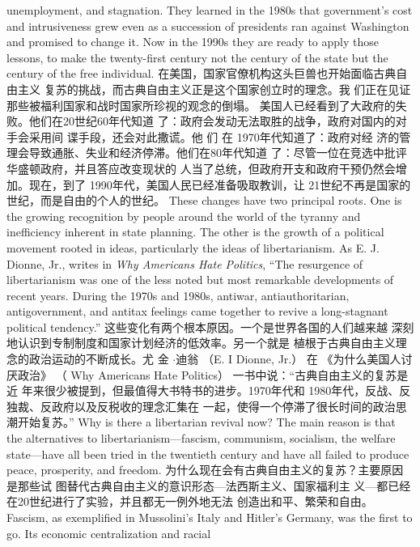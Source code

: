 \begin{paracol}{2}
unemployment, and stagnation. They learned in the 1980s that
government's cost and intrusiveness grew even as a succession
of presidents ran against Washington and promised to change
it. Now in the 1990s they are ready to apply those lessons, to
make the twenty-first century not the century of the state but
the century of the free individual.
\switchcolumn
在美国，国家官僚机构这头巨兽也开始面临古典自由主义
复苏的挑战，而古典自由主义正是这个国家创立时的理念。我
们正在见证那些被福利国家和战时国家所珍视的观念的倒塌。
美国人已经看到了大政府的失败。他们在20世纪60年代知道
了：政府会发动无法取胜的战争，政府对国内的对手会采用间
谍手段，还会对此撒谎。他 们 在 1970年代知道了：政府对经
济的管理会导致通胀、失业和经济停滞。他们在80年代知道
了：尽管一位在竞选中批评华盛顿政府，并且答应改变现状的
人当了总统，但政府开支和政府干预仍然会增加。现在，到了
1990年代，美国人民已经准备吸取教训，让 21世纪不再是国家的世纪，而是自由的个人的世纪。
\switchcolumn*
These changes have two principal roots. One is the growing
recognition by people around the world of the tyranny and inefficiency inherent in state planning. The other is the growth of a
political movement rooted in ideas, particularly the ideas of libertarianism. As E. J. Dionne, Jr., writes in \textit{Why Americans Hate Politics}, ``The resurgence of libertarianism was one of the less
noted but most remarkable developments of recent years. During the 1970s and 1980s, antiwar, antiauthoritarian, antigovernment, and antitax feelings came together to revive a
long-stagnant political tendency.''
\switchcolumn
这些变化有两个根本原因。一个是世界各国的人们越来越
深刻地认识到专制制度和国家计划经济的低效率。另一个就是
植根于古典自由主义理念的政治运动的不断成长。尤 金 $\cdot$迪翁
（E. I Dionne, Jr.） 在 《为什么美国人讨厌政治》 （ Why Americans Hate Politics） 一书中说：“古典自由主义的复苏是近
年来很少被提到，但最值得大书特书的进步。1970年代和
1980年代，反战、反独裁、反政府以及反税收的理念汇集在
一起，使得一个停滞了很长时间的政治思潮开始复苏。”
\switchcolumn*
Why is there a libertarian revival now? The main reason is
that the alternatives to libertarianism---fascism, communism,
socialism, the welfare state---have all been tried in the twentieth century and have all failed to produce peace, prosperity, and freedom.
\switchcolumn
为什么现在会有古典自由主义的复苏？主要原因是那些试
图替代古典自由主义的意识形态---法西斯主义、国家福利主
义---都已经在20世纪进行了实验，并且都无一例外地无法
创造出和平、繁荣和自由。
\switchcolumn*
Fascism, as exemplified in Mussolini's Italy and Hitler's Germany, was the first to go. Its economic centralization and racial

\end{paracol}
